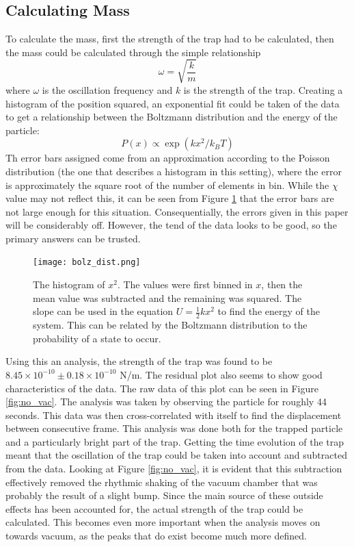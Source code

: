 \documentclass[12pt]{article}
\begin{document}
\subsection{Calculating Mass}
To calculate the mass, first the strength of the trap had to be calculated, then the mass could be calculated through the simple relationship 
\[\omega = \sqrt{\frac{k}{m}}\]
where $\omega$ is the oscillation frequency and $k$ is the strength of the trap. Creating a histogram of the position squared, an exponential fit could be taken of the data to get a relationship between the Boltzmann distribution and the energy of the particle:
\[P(x) \propto \exp(kx^2/k_B T)\]
Th error bars assigned come from an approximation according to the Poisson distribution (the one that describes a histogram in this setting), where the error is approximately the square root of the number of elements in bin. While the $\chi$ value may not reflect this, it can be seen from Figure \ref{fig:boltz} that the error bars are not large enough for this situation. Consequentially, the errors given in this paper will be considerably off. However, the tend of the data looks to be good, so the primary answers can be trusted. 

\begin{figure}
\texttt{[image: bolz\_dist.png]}\
\caption{The histogram of $x^2$. The values were first binned in $x$, then the mean value was subtracted and the remaining was squared. The slope can be used in the equation $U = \frac{1}{2}kx^2$ to find the energy of the system. This can be related by the Boltzmann distribution to the probability of a state to occur.}
\label{fig:boltz}
\end{figure}

Using this an analysis, the strength of the trap was found to be $8.45 \times 10^{-10} \pm 0.18 \times10^{-10}$ N/m. The residual plot also seems to show good characteristics of the data. The raw data of this plot can be seen in Figure \ref{fig:no_vac}. The analysis was taken by observing the particle for roughly 44 seconds. This data was then cross-correlated  with itself to find the displacement between consecutive frame. This analysis was done both for the trapped particle and a particularly bright part of the trap. Getting the time evolution of the trap meant that the oscillation of the trap could be taken into account and subtracted from the data. Looking at Figure \ref{fig:no_vac}, it is evident that this subtraction effectively removed the rhythmic shaking of the vacuum chamber that was probably the result of a slight bump. Since the main source of these outside effects has been accounted for, the actual strength of the trap could be calculated. This becomes even more important when the analysis moves on towards vacuum, as the peaks that do exist become much more defined. 
\end{document}
